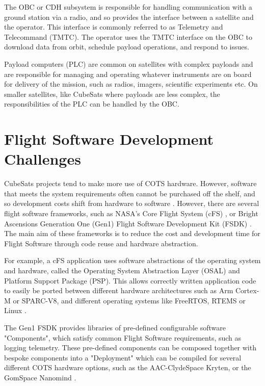 \documentclass[../report.tex]{subfiles}
\begin{document}
The OBC or CDH subsystem is responsible for handling communication with a
ground station via a radio, and so provides the interface between a satellite
and the operator. This interface is commonly referred to as Telemetry and
Telecommand (TMTC). The operator uses the TMTC interface on the OBC to download data
from orbit, schedule payload operations, and respond to issues.

Payload computers (PLC) are common on satellites with complex payloads and are
responsible for managing and operating whatever instruments are on board for
delivery of the mission, such as radios, imagers, scientific experiments etc.
On smaller satellites, like CubeSats where payloads are less complex, the
responsibilities of the PLC can be handled by the OBC.


\section{Flight Software Development Challenges}

CubeSats projects tend to make more use of COTS hardware. However, software that
meets the system requirements often cannot be purchased off the shelf, and so
development costs shift from hardware to software
\citep{Cubesat_Handbook_OBSW}. However, there are several flight software
frameworks, such as NASA's Core Flight System (cFS) \citep{Nasa_cFS}, or Bright
Ascensions Generation One (Gen1) Flight Software Development Kit (FSDK)
\citep{Bal_FSDK}. The main aim of these frameworks is to reduce the cost and
development time for Flight Software through code reuse and hardware
abstraction.

For example, a cFS application uses software abstractions of the operating
system and hardware, called the Operating System Abstraction Layer (OSAL) and
Platform Support Package (PSP). This allows correctly written application
code to easily be ported between different hardware architectures such as Arm
Cortex-M or SPARC-V8, and different operating systems like FreeRTOS, RTEMS or
Linux \citep{Nasa_cFS}.

The Gen1 FSDK provides libraries of pre-defined configurable software
"Components", which satisfy common Flight Software requirements, such as
logging telemetry. These pre-defined components can be composed together with
bespoke components into a "Deployment" which can be compiled for several
different COTS hardware options, such as the AAC-ClydeSpace Kryten, or the
GomSpace Nanomind \citep{Bal_Options}.
\end{document}
